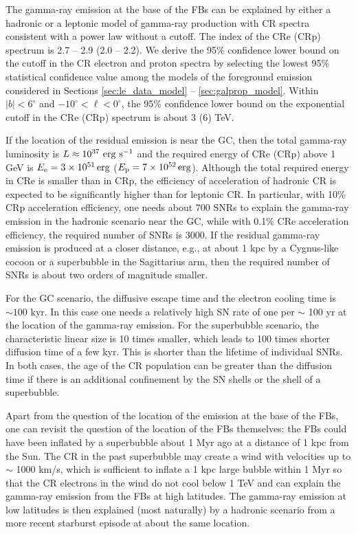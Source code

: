The gamma-ray emission at the base of the FBs can be explained by either a hadronic or a leptonic model of gamma-ray production
with CR spectra consistent with a power law without a cutoff.
The index of the CRe (CRp) spectrum is 2.7 -- 2.9 (2.0 -- 2.2).
We derive the 95\% confidence lower bound on the cutoff in the CR electron and proton spectra
by selecting the lowest 95\% statistical confidence value among the models of the foreground emission considered 
in Sections \ref{sec:le_data_model} -- \ref{sec:galprop_model}.
Within $|b| < 6^\circ$ and $-10^\circ < \ell < 0^\circ$, the 95\% confidence lower bound on the 
exponential cutoff in the CRe (CRp) spectrum is
about 3 (6) TeV.

If the location of the residual emission is near the GC,
then the total gamma-ray luminosity is $L \approx 10^{37}\ {\rm erg\ s^{-1}}$ and
the required energy of CRe (CRp) above 1 GeV is $E_{\rm e} = \SI{3e51}{erg}$
($E_{\rm p} = \SI{7e52}{erg}$).
Although the total required energy in CRe is smaller than in CRp,
the efficiency of acceleration of hadronic CR is expected to be significantly higher than for leptonic CR.
In particular, with 10\% CRp acceleration efficiency, one needs about 700 SNRs to explain the 
gamma-ray emission in the hadronic scenario near the GC,
while with 0.1\% CRe acceleration efficiency, the required number of SNRs is 3000.
If the residual gamma-ray emission is produced at a closer distance, e.g., at about 1 kpc
by a Cygnus-like cocoon or a superbubble in the Sagittarius arm, 
then the required number of SNRs is about two orders of magnitude smaller.

For the GC scenario, the diffusive escape time and the electron cooling time is $\sim 100$ kyr.
In this case one needs a relatively high SN rate of one per $\sim$ 100 yr at the location of the gamma-ray emission.
For the superbubble scenario, the characteristic linear size is 10 times smaller, which leads to 100 times shorter
diffusion time of a few kyr. This is shorter than the lifetime of individual SNRs.
In both cases, the age of the CR population can be greater than the diffusion time if there is an
additional confinement by the SN shells or the shell of a superbubble.

Apart from the question of the location of the emission at the base of the FBs,
one can revisit the question of the location of the FBs themselves:
the FBs could have been inflated by a superbubble about 1 Myr ago
at a distance of 1 kpc from the Sun.
The CR in the past superbubble may create a wind with velocities up to $\sim$ 1000 km/s, 
which is sufficient to inflate a 1 kpc large bubble within 1 Myr
so that the CR electrons in the wind do not cool below 1 TeV and can explain the
gamma-ray emission from the FBs at high latitudes.
The gamma-ray emission at low latitudes is then explained (most naturally) by a hadronic
scenario from a more recent starburst episode at about the same location.

